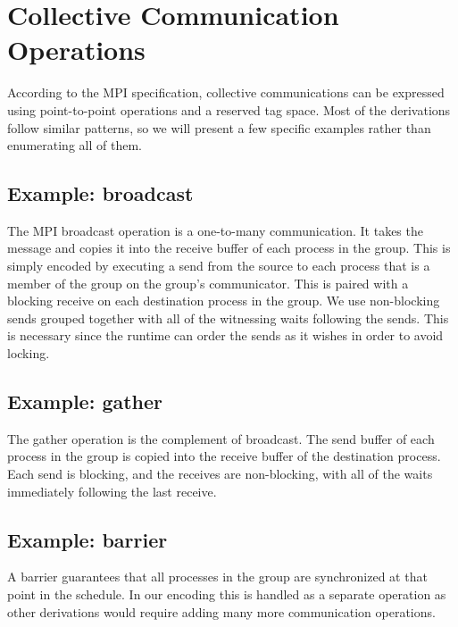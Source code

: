 \section{Collective Communication Operations}

According to the MPI specification, collective communications can be expressed
using point-to-point operations and a reserved tag space. Most of the
derivations follow similar patterns, so we will present a few specific examples
rather than enumerating all of them.

\subsection{Example: broadcast}
The MPI broadcast operation is a one-to-many communication. It takes the message
and copies it into the receive buffer of each process in the group. This is
simply encoded by executing a send from the source to each process that is a
member of the group on the group's communicator. This is paired with a blocking
receive on each destination process in the group. We use non-blocking sends
grouped together with all of the witnessing waits following the sends. This is
necessary since the runtime can order the sends as it wishes in order to avoid
locking.

\subsection{Example: gather}
The gather operation is the complement of broadcast. The send buffer of each
process in the group is copied into the receive buffer of the destination
process. Each send is blocking, and the receives are non-blocking, with all of
the waits immediately following the last receive.

\subsection{Example: barrier}
A barrier guarantees that all processes in the group are synchronized at that
point in the schedule. In our encoding this is handled as a separate operation
as other derivations would require adding many more communication operations.

